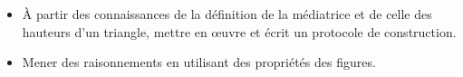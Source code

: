 \begin{prerequis}[Objectifs de 5\up{e}]  
    \begin{itemize}  
        \item À partir des connaissances de la définition de la médiatrice et de celle  des hauteurs d’un triangle, mettre en œuvre et écrit un protocole de construction.
        \item Mener des raisonnements en utilisant des propriétés des figures.
    \end{itemize}
\end{prerequis}